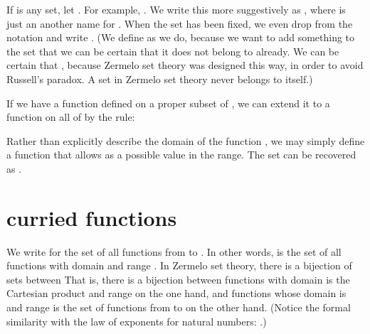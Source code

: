 \documentclass[cup9a]{cupbook}
\begin{document}
If  is any set, let .  For example,
.  We write this more suggestively
as , where  is just an
another name for .  When the set  has been fixed, we even drop
 from the notation and write .
(We define  as we do, because we want to add something to the set 
that we can be certain that it does not belong to  already.  We can
be certain that , because Zermelo set theory was designed this
way, in order to avoid Russell's paradox.  A set in Zermelo set theory
never belongs to itself.)

If we have a function  defined on a proper subset  of , we can
extend it to a function  on all of  by the rule:

Rather than explicitly describe the domain of the function , we may simply
define a function  that allows  as a possible value in the range.  The set  can be recovered as
.







\section{curried functions}

We write  for the set of all functions from  to .  In other
words,  is the set of all functions with domain  and range .
In Zermelo set theory, there is a bijection of sets between
That is, there is a bijection between functions with domain is the Cartesian product  and range  on the one hand, and functions whose domain is  and range is the set of functions from  to  on the other hand.
(Notice the formal similarity with the law of exponents for natural numbers:
.)
\end{document}
